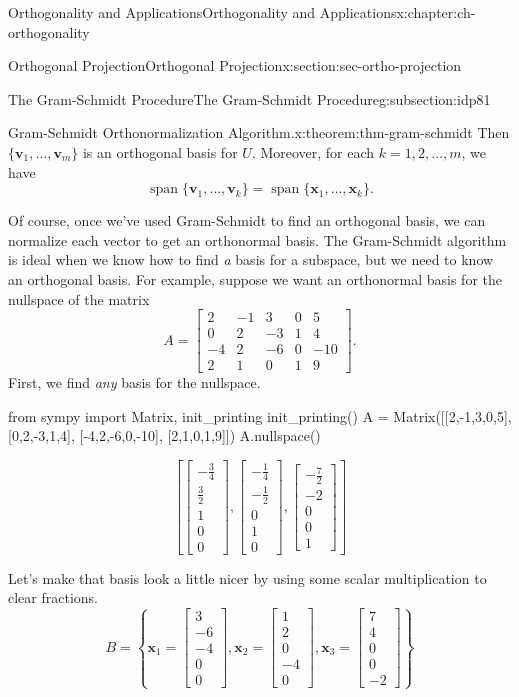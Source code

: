 \documentclass[oneside,10pt,]{book}
\numberwithin{equation}{section}
\newcommand{\spn}{\operatorname{span}}
\newcommand{\bbm}{\begin{bmatrix}}
\newcommand{\ebm}{\end{bmatrix}}
\newcommand{\vv}{\mathbf{v}}
\newcommand{\xx}{\mathbf{x}}
\newcommand{\amp}{&}
\begin{document}
\begin{chapterptx}{Orthogonality and Applications}{}{Orthogonality and Applications}{}{}{x:chapter:ch-orthogonality}
\begin{sectionptx}{Orthogonal Projection}{}{Orthogonal Projection}{}{}{x:section:sec-ortho-projection}
\begin{subsectionptx}{The Gram-Schmidt Procedure}{}{The Gram-Schmidt Procedure}{}{}{g:subsection:idp81}
\begin{theorem}{Gram-Schmidt Orthonormalization Algorithm.}{}{x:theorem:thm-gram-schmidt}
Then \(\{\vv_1,\ldots, \vv_m\}\) is an orthogonal basis for \(U\). Moreover, for each \(k=1,2,\ldots, m\), we have%
\begin{equation*}
\spn\{\vv_1,\ldots, \vv_k\} = \spn\{\xx_1,\ldots, \xx_k\}\text{.}
\end{equation*}
%
\end{theorem}
Of course, once we've used Gram-Schmidt to find an orthogonal basis, we can normalize each vector to get an orthonormal basis. The Gram-Schmidt algorithm is ideal when we know how to find \emph{a} basis for a subspace, but we need to know an orthogonal basis. For example, suppose we want an orthonormal basis for the nullspace of the matrix%
\begin{equation*}
A = \bbm 2 \amp -1 \amp 3 \amp 0 \amp 5\\0 \amp 2 \amp -3  \amp 1 \amp 4\\ -4 \amp 2 \amp -6 \amp 0 \amp -10\\ 2 \amp 1 \amp 0 \amp 1 \amp 9\ebm\text{.}
\end{equation*}
First, we find \emph{any} basis for the nullspace.%
\begin{sageinput}
from sympy import Matrix, init_printing
init_printing()
A = Matrix([[2,-1,3,0,5],
            [0,2,-3,1,4],
            [-4,2,-6,0,-10],
            [2,1,0,1,9]])
A.nullspace()
\end{sageinput}
\begin{sageoutput}
\[\left[\bbm -\frac34\\ \frac32\\1\\0\\0\ebm, \bbm -\frac14\\ -\frac12\\0\\1\\0\ebm, \bbm -\frac72\\-2\\0\\0\\1\ebm\right]\]
\end{sageoutput}
Let's make that basis look a little nicer by using some scalar multiplication to clear fractions.%
\begin{equation*}
B=\left\{\xx_1=\bbm 3\\-6\\-4\\0\\0\ebm, \xx_2=\bbm 1\\2\\0\\-4\\0\ebm, \xx_3=\bbm 7\\4\\0\\0\\-2\ebm\right\}

\end{equation*}
\end{subsectionptx}
\end{sectionptx}
\end{chapterptx}
\end{document}
